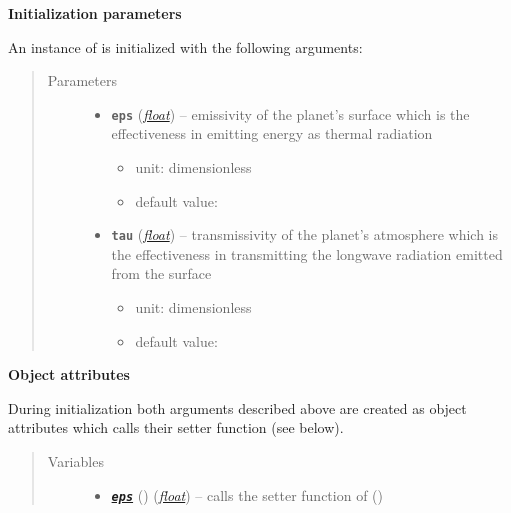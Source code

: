 \documentclass[a4paper,10pt,english]{sphinxmanual}
\begin{document}
\begin{fulllineitems}
\textbf{Initialization parameters}

An instance of  is initialized with the following 
arguments:
\begin{quote}\begin{description}
\item[{Parameters}] \leavevmode\begin{itemize}
\item {} 
\textbf{\texttt{eps}} (\href{http://docs.python.org/2.7/library/functions.html\#float}{\emph{float}}) -- 
emissivity of the planet's surface which is the
effectiveness in emitting energy as thermal radiation
\begin{itemize}
\item {} 
unit: dimensionless

\item {} 
default value: 

\end{itemize}


\item {} 
\textbf{\texttt{tau}} (\href{http://docs.python.org/2.7/library/functions.html\#float}{\emph{float}}) -- 
transmissivity of the planet's atmosphere which is the 
effectiveness in transmitting the longwave radiation
emitted from the surface
\begin{itemize}
\item {} 
unit: dimensionless

\item {} 
default value: 

\end{itemize}


\end{itemize}

\end{description}\end{quote}

\textbf{Object attributes}

During initialization both arguments described above are created as object 
attributes which calls their setter function (see below).
\begin{quote}\begin{description}
\item[{Variables}] \leavevmode\begin{itemize}
\item {} 
{\hyperref[api/climlab.radiation:climlab.radiation.Boltzmann.Boltzmann.eps]{\emph{\textbf{\texttt{eps}}}}} () (\href{http://docs.python.org/2.7/library/functions.html\#float}{\emph{float}}) -- calls the setter function of {\hyperref[api/climlab.radiation:climlab.radiation.Boltzmann.Boltzmann.eps]{\emph{}}} ()


\end{itemize}
\end{description}
\end{quote}
\end{fulllineitems}
\end{document}
